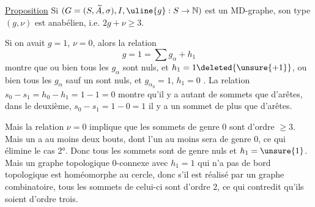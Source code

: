 \uline{Proposition} Si $(G=(S,\widetilde A,\sigma),I,\uline{g}:S\to\mathbb N)$ est un MD-graphe, son type $(g,\nu)$ est anabélien, i.e. $2g+\nu\geq3$.

Si on avait $g=1$, $\nu=0$, alors la relation
\[
g=1=\sum g_\alpha+h_1
\]
montre que ou bien tous les $g_\alpha$ sont nuls, et $h_1=1\deleted{\unsure{+1}}$, ou bien tous les $g_\alpha$ sauf un  sont nuls, et $g_{\alpha_0}=1$, $h_1=0$ .  La relation $s_0-s_1=h_0-h_1=1-1=0$ montre qu'il y a autant de sommets que d'arêtes, dans le deuxième, $s_0-s_1=1-0=1$ il y a un sommet de plus que d'arêtes.

Mais la relation $\nu=0$ implique que les sommets de genre $0$ sont d'ordre $\geq3$.  Mais un   a au moins deux bouts, dont l'un au moins sera de genre $0$, ce qui élimine le cas 2°. Donc tous les sommets sont de genre nuls  et $h_1=\unsure{1}$. Mais  un graphe topologique $0$-connexe avec $h_1=1$ qui n'a pas de  bord topologique est homéomorphe au cercle, donc s'il est réalisé par un graphe combinatoire, tous les sommets de celui-ci sont d'ordre $2$, ce qui contredit qu'ils soient d'ordre trois.
